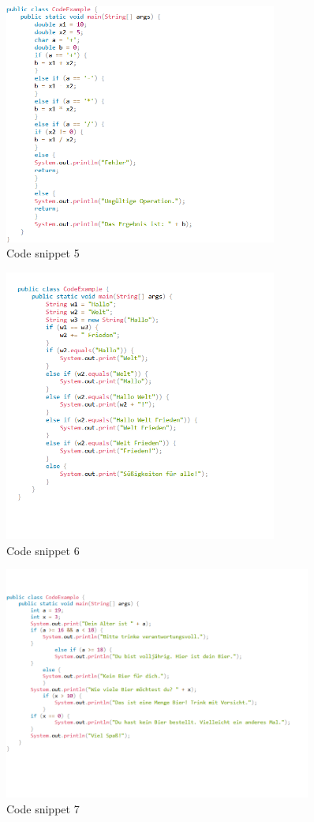 \begin{figure}[H]
    \centering
    \includegraphics[width=0.8\textwidth]{figures/rechner.png}
    \caption{Code snippet 5}
    \label{fig:appendix-example5}
\end{figure}


\begin{figure}[H]
    \centering
    \includegraphics[width=0.8\textwidth]{figures/hello.png}
    \caption{Code snippet 6}
    \label{fig:appendix-example6}
\end{figure}


\begin{figure}[H]
    \centering
    \includegraphics[width=0.9\textwidth]{figures/bier.png}
    \caption{Code snippet 7}
    \label{fig:appendix-example7}
\end{figure}

\thispagestyle{plain}